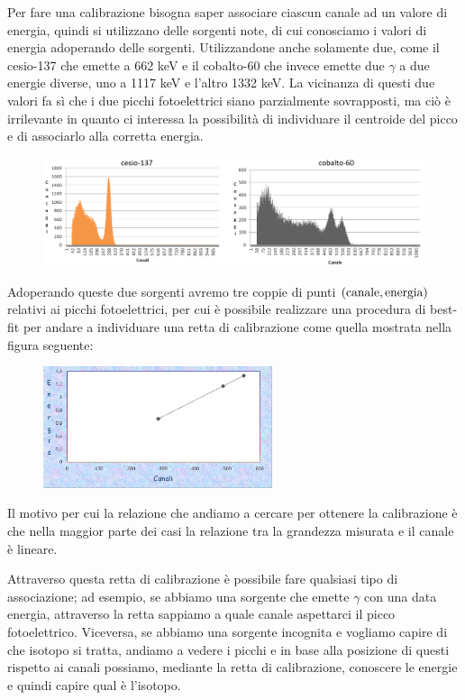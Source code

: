 Per fare una calibrazione bisogna saper associare ciascun canale ad un valore di energia, quindi si utilizzano delle sorgenti note, di cui conosciamo i valori di energia adoperando delle sorgenti. Utilizzandone anche solamente due, come il cesio-137 che emette a 662 keV e il cobalto-60 che invece emette due $\gamma$ a due energie diverse, uno a 1117 keV e l'altro 1332 keV. La vicinanza di questi due valori fa sì che i due picchi fotoelettrici siano parzialmente sovrapposti, ma ciò è irrilevante in quanto ci interessa la possibilità di individuare il centroide del picco e di associarlo alla corretta energia.
\begin{figure}[H]
   \centering
   \includegraphics[width=\textwidth]{immagini/sorgenti_calibrazione.png}
\end{figure}
Adoperando queste due sorgenti avremo tre coppie di punti $\rm (canale, energia)$ relativi ai picchi fotoelettrici, per cui è possibile realizzare una procedura di best-fit per andare a individuare una retta di calibrazione come quella mostrata nella figura seguente:
\begin{figure}[H]
   \centering
   \includegraphics[width=0.6\textwidth]{immagini/retta_calibrazione_cesio_cobalto.png}
\end{figure}
Il motivo per cui la relazione che andiamo a cercare per ottenere la calibrazione è che nella maggior parte dei casi la relazione tra la grandezza misurata e il canale è lineare.

Attraverso questa retta di calibrazione è possibile fare qualsiasi tipo di associazione; ad esempio, se abbiamo una sorgente che emette $\gamma$ con una data energia, attraverso la retta sappiamo a quale canale aspettarci il picco fotoelettrico. Viceversa, se abbiamo una sorgente incognita e vogliamo capire di che isotopo si tratta, andiamo a vedere i picchi e in base alla posizione di questi rispetto ai canali possiamo, mediante la retta di calibrazione, conoscere le energie e quindi capire qual è l'isotopo.

